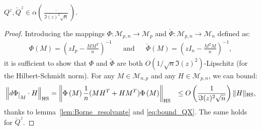 \documentclass[ECP, preprint]{ejpecp} %
\newcommand\restrict[2]{{#1}\raisebox{-.5ex}{$|$}_{#2}}
\DeclareMathOperator{\tr}{Tr}
\DeclareMathOperator{\hs}{HS}
\begin{document}
\begin{proposition}\label{pro:concentration_resolvente_1}
  $Q^z, \check Q^z \in \alpha(\frac{\cdot}{\Im (z)^2\sqrt n})$.
\end{proposition}
\begin{proof}
  Introducing the mappings $\Phi : \mathcal M_{p,n} \to \mathcal M_{p}$ and $\check\Phi: \mathcal M_{p,n} \to \mathcal M_{n}$ defined as:
  \begin{align*}
     \Phi(M) =  \left(zI_p - \frac{MM^T}{n}\right)^{-1}&
     &\text{and}&
     &\check \Phi(M) =  \left(zI_n - \frac{M^TM}{n}\right)^{-1},
   \end{align*}
   it is sufficient to show that $\Phi$ and $\check \Phi$ are both $O(1/\sqrt n\Im(z)^2)$-Lipschitz (for the Hilbert-Schmidt norm).
    For any $M \in \mathcal M_{n,p}$ and any $H \in \mathcal M_{p,n}$, we can bound:
  \begin{align*}
    \left\Vert \restrict{d\Phi }{M} \cdot H \right\Vert_{\hs} 
    &= \left\Vert \Phi \left(M\right)\frac{1}{n}(MH^T + HM^T) \Phi \left(M\right)\right\Vert_{\hs}
    &\leq O \left( \frac{1}{\Im(z)^2\sqrt n} \right) \|H\|_{\hs},
  \end{align*}
  thanks to lemma~\ref{lem:Borne_resolvante} and \eqref{eq:bound_QX}.
  The same holds for $\check Q^z$.
\end{proof}
\end{document}
